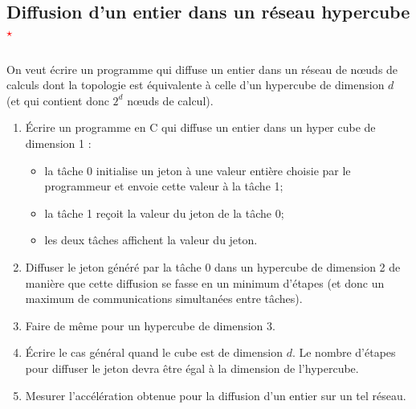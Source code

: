 \documentclass[11pt,a4paper]{article}
\begin{document}
\subsection{Diffusion d'un entier dans un réseau hypercube\textcolor{red}{$^{\star}$}}

On veut écrire un programme qui diffuse un entier dans un réseau de n{\oe}uds de calculs dont la topologie
est équivalente à celle d'un hypercube de dimension $d$ (et qui contient donc $2^{d}$ n{\oe}uds de calcul).

\begin{enumerate}
\item \'Ecrire un programme en C qui diffuse un entier dans un hyper cube de dimension 1 :
\begin{itemize}
\item la tâche 0 initialise un jeton à une valeur entière choisie par le programmeur et envoie cette valeur 
à la tâche 1; 
\item la tâche 1 reçoit la valeur du jeton de la tâche 0;
\item les deux tâches affichent la valeur du jeton.
\end{itemize}
\item Diffuser le jeton généré par la tâche 0 dans un hypercube de dimension 2 de manière que cette diffusion se fasse en un minimum
d'étapes (et donc un maximum de communications simultanées entre tâches).
\item Faire de même pour un hypercube de dimension 3.
\item \'Ecrire le cas général quand le cube est de dimension $d$. Le nombre d'étapes pour diffuser le jeton devra
être égal à la dimension de l'hypercube.
\item Mesurer l'accélération obtenue pour la diffusion d'un entier sur un tel réseau.
\end{enumerate}
\end{document}
